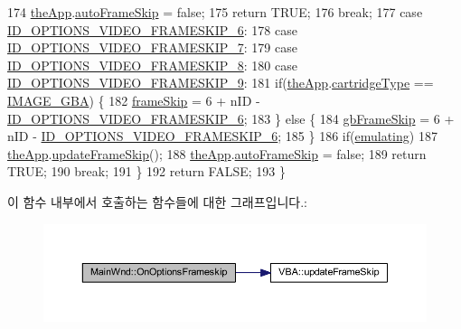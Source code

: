 \begin{DoxyCode}
174     \mbox{\hyperlink{_v_b_a_8cpp_a8095a9d06b37a7efe3723f3218ad8fb3}{theApp}}.\mbox{\hyperlink{class_v_b_a_a9ecbee7d82db73b24aee3afb66128388}{autoFrameSkip}} = \textcolor{keyword}{false};
175     \textcolor{keywordflow}{return} TRUE;
176     \textcolor{keywordflow}{break};
177   \textcolor{keywordflow}{case} \mbox{\hyperlink{resource_8h_a9433a150895b8f9063025c8ac7131d25}{ID\_OPTIONS\_VIDEO\_FRAMESKIP\_6}}:
178   \textcolor{keywordflow}{case} \mbox{\hyperlink{resource_8h_af7196ee142473e4df642ed88deda6f58}{ID\_OPTIONS\_VIDEO\_FRAMESKIP\_7}}:
179   \textcolor{keywordflow}{case} \mbox{\hyperlink{resource_8h_a4ab38b79164e6e7b3b4351779cd3f60c}{ID\_OPTIONS\_VIDEO\_FRAMESKIP\_8}}:
180   \textcolor{keywordflow}{case} \mbox{\hyperlink{resource_8h_a1476b40c7111bc83d7a8c8ae47654fce}{ID\_OPTIONS\_VIDEO\_FRAMESKIP\_9}}:
181     \textcolor{keywordflow}{if}(\mbox{\hyperlink{_v_b_a_8cpp_a8095a9d06b37a7efe3723f3218ad8fb3}{theApp}}.\mbox{\hyperlink{class_v_b_a_af300759fcbc7eeb00ce73f956fc5ddb7}{cartridgeType}} == \mbox{\hyperlink{_util_8h_aef8b88d56fdf9a25f990a68d80c014d8a25f0ac1f3a37d568346fedece32e4bfb}{IMAGE\_GBA}}) \{
182       \mbox{\hyperlink{_globals_8cpp_a668e22999d7fcea3ed14130fd680b795}{frameSkip}} = 6 + nID - \mbox{\hyperlink{resource_8h_a9433a150895b8f9063025c8ac7131d25}{ID\_OPTIONS\_VIDEO\_FRAMESKIP\_6}};
183     \} \textcolor{keywordflow}{else} \{
184       \mbox{\hyperlink{_g_b_8cpp_a2139360d32d74969f470ef05414ecaf8}{gbFrameSkip}} = 6 + nID - \mbox{\hyperlink{resource_8h_a9433a150895b8f9063025c8ac7131d25}{ID\_OPTIONS\_VIDEO\_FRAMESKIP\_6}};
185     \}
186     \textcolor{keywordflow}{if}(\mbox{\hyperlink{_main_wnd_options_8cpp_af9cc36078b1b311753963297ae7f2a74}{emulating}})
187       \mbox{\hyperlink{_v_b_a_8cpp_a8095a9d06b37a7efe3723f3218ad8fb3}{theApp}}.\mbox{\hyperlink{class_v_b_a_a2b3524193d398b041e90907430361ed8}{updateFrameSkip}}();
188     \mbox{\hyperlink{_v_b_a_8cpp_a8095a9d06b37a7efe3723f3218ad8fb3}{theApp}}.\mbox{\hyperlink{class_v_b_a_a9ecbee7d82db73b24aee3afb66128388}{autoFrameSkip}} = \textcolor{keyword}{false};
189     \textcolor{keywordflow}{return} TRUE;
190     \textcolor{keywordflow}{break};
191   \}
192   \textcolor{keywordflow}{return} FALSE;
193 \}
\end{DoxyCode}
이 함수 내부에서 호출하는 함수들에 대한 그래프입니다.\+:
\nopagebreak
\begin{figure}[H]
\begin{center}
\leavevmode
\includegraphics[width=350pt]{class_main_wnd_a753174cb5893b2a20c004f9431d1f7aa_cgraph}
\end{center}
\end{figure}
\mbox{\label{class_main_wnd_aafb7bdce8ddf0dbe3420c1f5fcd9fd62}} 
